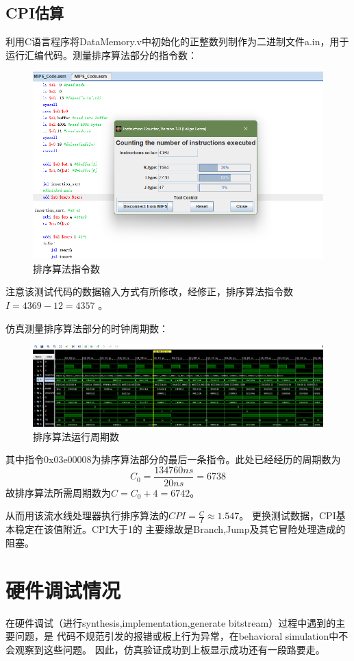 \documentclass[10pt]{article}
\begin{document}
\subsection{CPI估算}
利用C语言程序将DataMemory.v中初始化的正整数列制作为二进制文件a.in，用于
运行汇编代码。测量排序算法部分的指令数：
\begin{figure}[H]
    \centering
    \includegraphics[scale=0.8]{clcc.png}
    \caption{排序算法指令数}
    \end{figure}
注意该测试代码的数据输入方式有所修改，经修正，排序算法指令数$I=4369-12=4357$
。

仿真测量排序算法部分的时钟周期数：
\begin{figure}[H]
    \centering
    \includegraphics[scale=0.4]{clcs.png}
    \caption{排序算法运行周期数}
    \end{figure}
其中指令0x03e00008为排序算法部分的最后一条指令。此处已经经历的周期数为
$$C_0=\frac{134760ns}{20ns}=6738$$
故排序算法所需周期数为$C=C_0+4=6742$。

从而用该流水线处理器执行排序算法的$CPI=\frac{C}{I}\approx1.547$。
更换测试数据，CPI基本稳定在该值附近。CPI大于1的
主要缘故是Branch,Jump及其它冒险处理造成的阻塞。
\section{硬件调试情况}
在硬件调试（进行synthesis,implementation,generate bitstream）过程中遇到的主要问题，是
代码不规范引发的报错或板上行为异常，在behavioral simulation中不会观察到这些问题。
因此，仿真验证成功到上板显示成功还有一段路要走。
\end{document}
